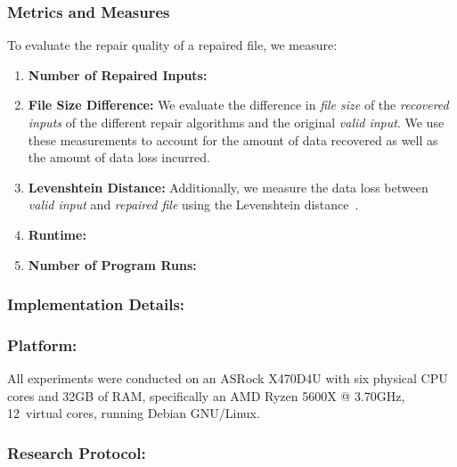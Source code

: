 \documentclass[sigconf,review,anonymous]{acmart}
\newcounter{todocounter}
\newcommand{\todo}[1]{\marginpar{$|$}\textcolor{red}{\stepcounter{todocounter}\footnote[\thetodocounter]{\textcolor{red}{\textbf{TODO }}\textit{#1}}}}
\renewcommand{\todo}[1]{}
\begin{document}
\subsubsection*{\bf Metrics and Measures}
To evaluate the repair quality of a repaired file, we measure:
\begin{enumerate}
	\item \textbf{Number of Repaired Inputs:} \todo{discuss}
    \item \textbf{File Size Difference: } We evaluate the difference in \textit{file size} of the \emph{recovered inputs} of the different repair algorithms and the original \textit{valid input}.
    We use these measurements to account for the amount of data recovered as well as the amount of data loss incurred.
\item \textbf{Levenshtein Distance: } Additionally, we measure the data loss between \textit{valid input} and \textit{repaired file} using the Levenshtein distance~\cite{levDistance}.

\item \textbf{Runtime: } \todo{discuss}

\item \textbf{Number of Program Runs: } \todo{discuss}

\end{enumerate}

\subsubsection*{\bf Implementation Details:}

\subsubsection*{\bf Platform:} All experiments were conducted
on an ASRock X470D4U with six physical CPU cores %
and 32GB of RAM, specifically an AMD Ryzen 5600X @ 3.70GHz, 12~virtual cores, running Debian GNU/Linux.


\subsubsection*{\bf Research Protocol:}\todo{we should mention the four minute timeout here ... }
\end{document}
